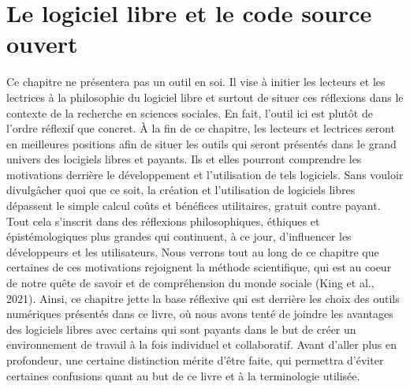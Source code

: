 \documentclass[
  letterpaper,
  DIV=11,
  numbers=noendperiod]{scrreprt}
\begin{document}

\chapter{Le logiciel libre et le code source ouvert}\label{sec-chap1}

Ce chapitre ne présentera pas un outil en soi. Il vise à initier les
lecteurs et les lectrices à la philosophie du logiciel libre et surtout
de situer ces réflexions dans le contexte de la recherche en sciences
sociales. En fait, l'outil ici est plutôt de l'ordre réflexif que
concret. À la fin de ce chapitre, les lecteurs et lectrices seront en
meilleures positions afin de situer les outils qui seront présentés dans
le grand univers des locigiels libres et payants. Ils et elles pourront
comprendre les motivations derrière le développement et l'utilisation de
tels logiciels. Sans vouloir divulgâcher quoi que ce soit, la création
et l'utilisation de logiciels libres dépassent le simple calcul coûts et
bénéfices utilitaires, gratuit contre payant. Tout cela s'inscrit dans
des réflexions philosophiques, éthiques et épistémologiques plus grandes
qui continuent, à ce jour, d'influencer les développeurs et les
utilisateurs. Nous verrons tout au long de ce chapitre que certaines de
ces motivations rejoignent la méthode scientifique, qui est au coeur de
notre quête de savoir et de compréhension du monde sociale (King et al.,
2021). Ainsi, ce chapitre jette la base réflexive qui est derrière les
choix des outils numériques présentés dans ce livre, où nous avons tenté
de joindre les avantages des logiciels libres avec certains qui sont
payants dans le but de créer un environnement de travail à la fois
individuel et collaboratif. Avant d'aller plus en profondeur, une
certaine distinction mérite d'être faite, qui permettra d'éviter
certaines confusions quant au but de ce livre et à la terminologie
utilisée.
\end{document}
